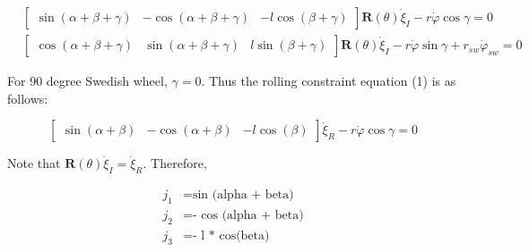 \documentclass[12pt]{article}
\begin{document}
\vspace{-5mm}

\begin{align}
	&\begin{bmatrix}
		\sin (\alpha + \beta + \gamma) 	&	- \cos (\alpha + \beta + \gamma) 	&	- l \cos(\beta + \gamma) 
	\end{bmatrix}
	\mathbf{R}(\theta) \dot{\xi}_I - r \dot{\varphi} \cos \gamma = 0 \\ 
	&\begin{bmatrix}
		\cos (\alpha + \beta + \gamma) 	&	\sin (\alpha + \beta + \gamma) 	&	l \sin(\beta + \gamma) 
	\end{bmatrix}
	\mathbf{R}(\theta) \dot{\xi}_I - r \dot{\varphi} \sin \gamma  + r_{sw} \dot{\varphi}_{sw} = 0 
\end{align}

\noindent For 90 degree Swedish wheel, $\gamma = 0$. Thus the rolling constraint equation (1) is as follows:

\begin{equation}
	\begin{bmatrix}
		\sin (\alpha + \beta) 	&	- \cos (\alpha + \beta) 	&	- l \cos(\beta) 
	\end{bmatrix}
	\dot{\xi}_R - r \dot{\varphi} \cos \gamma = 0 
\end{equation} 

\noindent Note that $\mathbf{R}(\theta) \dot{\xi}_I = \dot{\xi}_R$. Therefore,

\begin{align}
	j_1 &= \text{sin (alpha + beta)}\\
	j_2 &= \text{- cos (alpha + beta)}\\
	j_3 &= \text{- l * cos(beta)}
\end{align}
\end{document}
